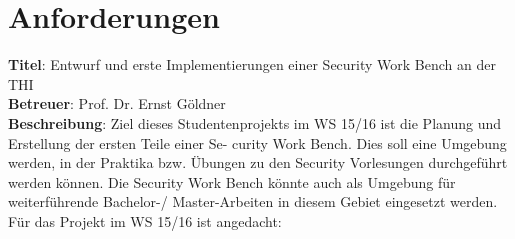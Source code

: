 \chapter{Anforderungen}

\textbf{Titel}: Entwurf und erste Implementierungen einer Security Work Bench an der THI \\
\textbf{Betreuer}: Prof. Dr. Ernst Göldner\\
\textbf{Beschreibung}:
Ziel dieses Studentenprojekts im WS 15/16 ist die Planung und Erstellung der ersten Teile einer Se-
curity Work Bench. Dies soll eine Umgebung werden, in der Praktika bzw. Übungen zu den Security
Vorlesungen durchgeführt werden können. Die Security Work Bench könnte auch als Umgebung für
weiterführende Bachelor-/ Master-Arbeiten in diesem Gebiet eingesetzt werden.\\
Für das Projekt im WS 15/16 ist angedacht:

